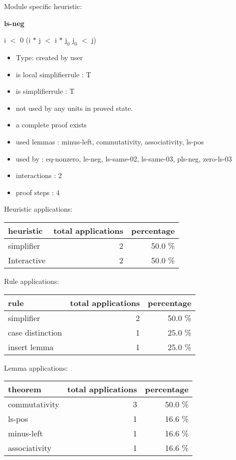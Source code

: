 \documentclass[a4paper]{article}
\begin{document}
Module specific heuristic:

\pagebreak

{\LARGE\bf ls-neg}\label{lemma-ls-neg}

\medskip

 \Fol i $<$ 0 \Imp (i $*$ j $<$ i $*$ $\mbox{j}_{0}$ \Equiv $\mbox{j}_{0}$ $<$ j)

\begin{itemize}

\item Type: created by user

\item is local simplifierrule : T
\item is simplifierrule : T
\item not used by any units in proved state.
\item       a complete proof exists
\item       used lemmas  : minus-left, commutativity, associativity, ls-pos
\item       used by      : eq-nonzero, le-neg, ls-same-02, ls-same-03, pls-neg, zero-ls-03
\item       interactions : 2
\item       proof steps  : 4
\end{itemize}

\medskip


Heuristic applications:

\begin{supertabular}{l|r|r}
heuristic	& total applications & percentage \\ \hline
simplifier & 2 & 50.0 \% \\
Interactive & 2 & 50.0 \% \\

\end{supertabular}

Rule applications:

\begin{supertabular}{l|r|r}
rule	        & total applications & percentage \\ \hline
simplifier & 2 & 50.0 \% \\
case distinction & 1 & 25.0 \% \\
insert lemma & 1 & 25.0 \% \\

\end{supertabular}

Lemma applications:

\begin{supertabular}{l|r|r}
theorem	        & total applications & percentage \\ \hline
commutativity & 3 & 50.0 \% \\
ls-pos & 1 & 16.6 \% \\
minus-left & 1 & 16.6 \% \\
associativity & 1 & 16.6 \% \\

\end{supertabular}
\end{document}
